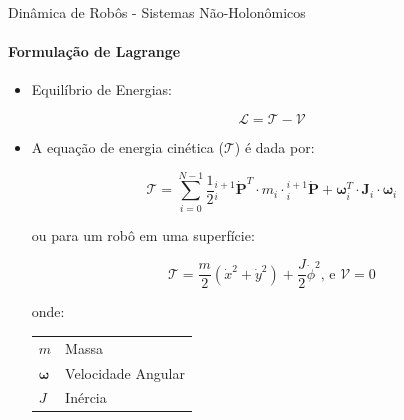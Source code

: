 \documentclass{beamer}
\begin{document}
\begin{frame}{Dinâmica de Robôs - Sistemas Não-Holonômicos}
    \framesubtitle{Formulação de Lagrange}

    \begin{itemize}

        \item Equilíbrio de Energias:

              \begin{equation}
                  \mathcal{L}= \mathcal{T} - \mathcal{V}
              \end{equation}

        \item A equação de energia cinética ($\mathcal{T}$) é dada por:

              \begin{equation}
                  \mathcal{T} = \sum\limits_{i=0}^{N-1} \frac{1}{2} {}_{i}^{i+1}\dot{\mathbf{P}}^T\cdot m_{i}\cdot {}_{i}^{i+1}\dot{\mathbf{P}}+ \mathbf{\omega}_i^T\cdot \mathbf{J}_i \cdot \mathbf{\omega}_i
              \end{equation}

              \begin{block}{ou para um robô em uma superfície:}

                  \begin{equation*}
                      \boxed{
                          \mathcal{T} = \frac{m}{2}\left(\dot{x}^2+\dot{y}^2 \right)+ \frac{J}{2}\dot{\phi}^2}
                      \text{, e  }
                      \boxed{\mathcal{V} = 0}
                  \end{equation*}
                  \scriptsize{
                      onde:
                      \begin{tabular}{l|l}
                          $m$               & Massa              \\
                          $\mathbf{\omega}$ & Velocidade Angular \\
                          $J$               & Inércia            \\
                      \end{tabular}}
              \end{block}
    \end{itemize}
\end{frame}
\end{document}

